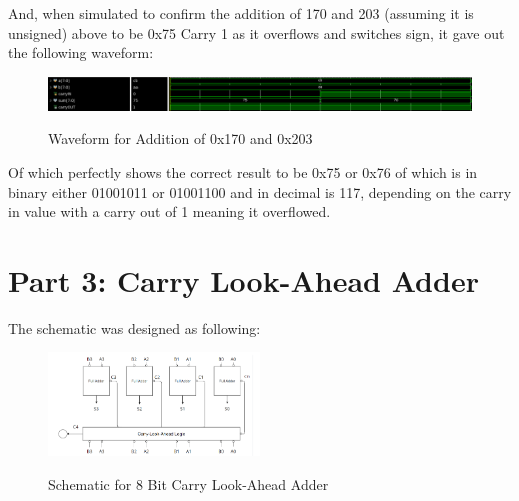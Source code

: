 And, when simulated to confirm the addition of 170 and 203 (assuming it is unsigned) above to be 0x75 Carry 1 as it overflows and switches sign, it gave out the following waveform:
\begin{figure}[!htbp]
    \centering
    \caption{Waveform for Addition of 0x170 and 0x203}
    \includegraphics[width=1\textwidth]{part-2-waveform.png}
    \label{Waveform for Addition of 170 and 203}
\end{figure}

Of which perfectly shows the correct result to be 0x75 or 0x76 of which is in binary either 01001011 or 01001100 and in decimal is 117, depending on the carry in value with a carry out of 1 meaning it overflowed.
\newpage


\section{Part 3: Carry Look-Ahead Adder}
The schematic was designed as following:
\begin{figure}[!htbp]
    \centering
    \caption{Schematic for 8 Bit Carry Look-Ahead Adder}
    \includegraphics[width=0.5\textwidth]{part-3-schem.png}
    \label{8 Bit Carry Look-Ahead Adder}
\end{figure}

